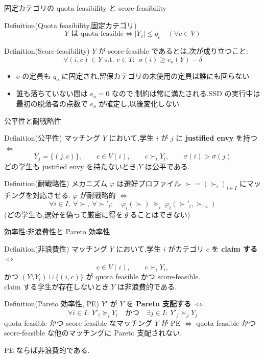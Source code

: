 \documentclass[aspectratio=43,11pt]{beamer}
\begin{document}
\begin{frame}{固定カテゴリの quota feasibility と score-feasibility}
\begin{block}{Definition(Quota feasibility,固定カテゴリ)}
  \[
    Y \text{ は quota feasible} \iff |Y_c| \leq q_c \quad (\forall c \in V)
  \]
\end{block}
\begin{block}{Definition(Score-feasibility)}
  $Y$ が score-feasible であるとは,次が成り立つこと:
  \[
    \forall (i,c) \in Y \text{ s.t. } c \in T:\ \ \sigma(i) \geq e_o(Y) - \delta
  \]
\end{block}
\begin{itemize}
  \item $o$ の定員も $q_o$ に固定され,留保カテゴリの未使用の定員は誰にも回らない
  \item 誰も落ちていない間は $e_o = 0$ なので,制約は常に満たされる.SSD の実行中は
        最初の脱落者の点数で $e_o$ が確定し,以後変化しない
\end{itemize}
\end{frame}

\begin{frame}{公平性と耐戦略性}
\small
\begin{block}{Definition(公平性)}
  マッチング $Y$ において,学生 $i$ が $j$ に \textbf{justified envy} を持つ $\iff$
  \[
    Y_j = \{(j, c)\}, \qquad c \in V(i), \qquad c \succ_i Y_i, \qquad \sigma(i) > \sigma(j)
  \]
  どの学生も justified envy を持たないとき,$Y$ は公平である.
\end{block}
\begin{block}{Definition(耐戦略性)}
  メカニズム $\varphi$ は選好プロファイル $\succ = (\succ_i)_{i\in I}$ にマッチングを対応させる.
  $\varphi$ が耐戦略的 $\iff$
  \[
    \forall i \in I,\ \forall \succ,\ \forall \succ'_i:\quad
    \varphi_i(\succ) \ \succeq_i\ \varphi_i(\succ'_i, \succ_{-i})
  \]
  (どの学生も,選好を偽って厳密に得をすることはできない)
\end{block}
\end{frame}

\begin{frame}{効率性:非浪費性と Pareto 効率性}
\small
\begin{block}{Definition(非浪費性)}
  マッチング $Y$ において,学生 $i$ がカテゴリ $c$ を \textbf{claim する} $\iff$
  \[
    c \in V(i), \qquad c \succ_i Y_i,
  \]
  かつ $(Y \setminus Y_i) \cup \{(i,c)\}$ が quota feasible かつ score-feasible.\\
  claim する学生が存在しないとき,$Y$ は非浪費的である.
\end{block}
\begin{block}{Definition(Pareto 効率性, PE)}
  $Y'$ が $Y$ を \textbf{Pareto 支配する} $\iff$
  \[
    \forall i \in I:\ Y'_i \succeq_i Y_i
    \quad\text{かつ}\quad
    \exists j \in I:\ Y'_j \succ_j Y_j
  \]
  quota feasible かつ score-feasible なマッチング $Y$ が PE $\iff$
  quota feasible かつ score-feasible な他のマッチングに Pareto 支配されない.
\end{block}
PE ならば非浪費的である.
\end{frame}
\end{document}
